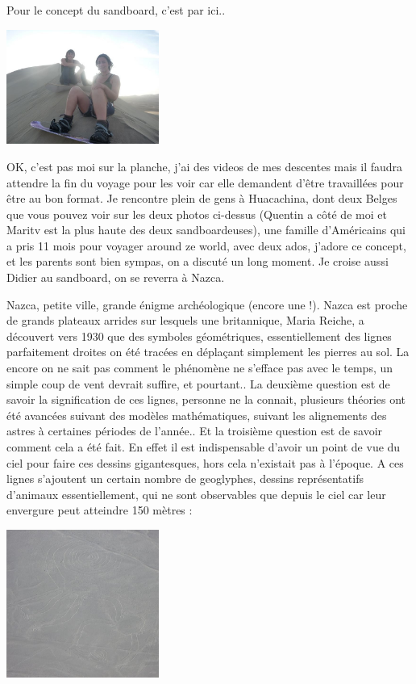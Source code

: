 \begin{multicols}{2}
Pour le concept du sandboard, c'est par ici..

\smallbreak
\hspace*{-0.65cm}
\includegraphics[width=5cm]{articles/Cote-du-sud/1255997499n41M.jpg}
\smallbreak

OK, c'est pas moi sur la planche, j'ai des videos de mes descentes mais il faudra attendre la fin du voyage pour les voir car elle demandent d'être travaillées pour être au bon format. Je rencontre plein de gens à Huacachina, dont deux Belges que vous pouvez voir sur les deux photos ci-dessus (Quentin a côté de moi et Maritv est la plus haute des deux sandboardeuses), une famille d'Américains qui a pris 11 mois pour voyager around ze world, avec deux ados, j'adore ce concept, et les parents sont bien sympas, on a discuté un long moment. Je croise aussi Didier au sandboard, on se reverra à Nazca.

Nazca, petite ville, grande énigme archéologique (encore une !). Nazca est proche de grands plateaux arrides sur lesquels une britannique, Maria Reiche, a découvert vers 1930 que des symboles géométriques, essentiellement des lignes parfaitement droites on été tracées en déplaçant simplement les pierres au sol. La encore on ne sait pas comment le phénomène ne s'efface pas avec le temps, un simple coup de vent devrait suffire, et pourtant.. La deuxième question est de savoir la signification de ces lignes, personne ne la connait, plusieurs théories ont été avancées suivant des modèles mathématiques, suivant les alignements des astres à certaines périodes de l'année.. Et la troisième question est de savoir comment cela a été fait. En effet il est indispensable d'avoir un point de vue du ciel pour faire ces dessins gigantesques, hors cela n'existait pas à l'époque. A ces lignes s'ajoutent un certain nombre de geoglyphes, dessins représentatifs d'animaux essentiellement, qui ne sont observables que depuis le ciel car leur envergure peut atteindre 150 mètres :

\smallbreak
\hspace*{-0.65cm}
\includegraphics[width=5cm]{articles/Cote-du-sud/1255996049EeEt.jpg}
\smallbreak


\end{multicols}
